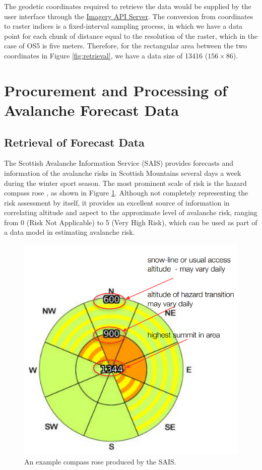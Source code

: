 \documentclass[11pt, oneside]{article}
\begin{document}
		The geodetic coordinates required to retrieve the data would be supplied by the user interface through the \hyperref[sec:APIServer]{Imagery API Server}. The conversion from coordinates to raster indices is a fixed-interval sampling process, in which we have a data point for each chunk of distance equal to the resolution of the raster, which in the case of OS5 is five meters. Therefore, for the rectangular area between the two coordinates in Figure \ref{fig:retrieval}, we have a data size of 13416 ($156 \times $86).
		
\section{Procurement and Processing of Avalanche Forecast Data}
	\subsection{Retrieval of Forecast Data}
		The Scottish Avalanche Information Service (SAIS)\cite{sais} provides forecasts and information of the avalanche risks in Scottish Mountains several days a week during the winter sport season. The most prominent scale of risk is the hazard compass rose \cite[p. 4]{sais-report}, as shown in Figure \ref{fig:compassrose}. Although not completely representing the risk assessment by itself, it provides an excellent source of information in correlating altitude and aspect to the approximate level of avalanche risk, ranging from 0 (Risk Not Applicable) to 5 (Very High Risk), which can be used as part of a data model in estimating avalanche risk.
		\begin{figure}[h]
		\centering
		\includegraphics[scale=0.3]{CompassRose.png}
		\caption{\label{fig:compassrose}An example compass rose produced by the SAIS.\cite[p. 4]{sais-report}}
		\end{figure}
		
\end{document}
